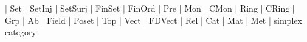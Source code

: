     |   Set
    |   SetInj
    |   SetSurj
    |   FinSet
    |   FinOrd
    |   Pre
    |   Mon
    |   CMon
    |   Ring
    |   CRing
    |   Grp
    |   Ab
    |   Field
    |   Poset
    |   Top
    |   Vect
    |   FDVect
    |   Rel
    |   Cat
    |   Mat
    |   Met
    |   simplex category
